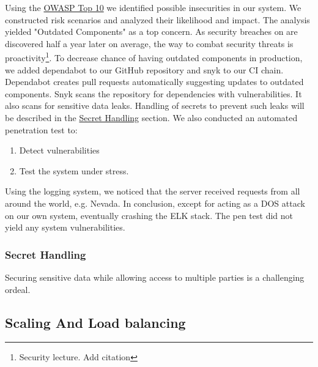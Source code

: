 Using the \href{https://owasp.org/Top10/}{OWASP Top 10} we identified possible insecurities in our system. We constructed risk scenarios and analyzed their likelihood and impact. 
The analysis yielded "Outdated Components" as a top concern. As security breaches on are discovered half a year later on average, the way to combat security threats is proactivity\footnote{Security lecture. Add citation}. To decrease chance of having outdated components in production, we added dependabot to our GitHub repository and snyk to our CI chain. Dependabot creates pull requests automatically suggesting updates to outdated components. Snyk scans the repository for dependencies with vulnerabilities. It also scans for sensitive data leaks. Handling of secrets to prevent such leaks will be described in the \hyperref[subsubsec:secrets]{Secret Handling} section.
We also conducted an automated penetration test to:
\begin{enumerate}
    \item Detect vulnerabilities
    \item Test the system under stress.
\end{enumerate}
Using the logging system, we noticed that the server received requests from all around the world, e.g. Nevada. In conclusion, except for acting as a DOS attack on our own system, eventually crashing the ELK stack. The pen test did not yield any system vulnerabilities.

\subsubsection{Secret Handling}
\label{subsubsec:secrets}
Securing sensitive data while allowing access to multiple parties is a challenging ordeal.

\subsection{Scaling And Load balancing}
\label{subsec:scaling}

